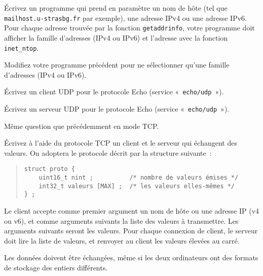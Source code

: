 %


% 

\question

Écrivez un programme qui prend en paramètre un nom de hôte (tel que
\texttt {mailhost.u-strasbg.fr} par exemple), une adresse IPv4 ou
une adresse IPv6. Pour chaque adresse trouvée par la fonction \texttt
{getaddrinfo}, votre programme doit afficher la famille d'adresses
(IPv4 ou IPv6) et l'adresse avec la fonction \texttt {inet\_ntop}.


\question

Modifiez votre programme précédent pour ne sélectionner qu'une
famille d'adresses (IPv4 ou IPv6).



\question

Écrivez un client UDP pour le protocole Echo (service «~\texttt
{echo/udp}~»).

Écrivez un serveur UDP pour le protocole Echo (service «~\texttt
{echo/udp}~»).

\question

Même question que précédemment en mode TCP.


\question

Écrivez à l'aide du protocole TCP un client et le serveur qui
échangent des valeurs. On adoptera le protocole décrit par la
structure suivante~:

\begin {quote}
\begin {verbatim}
struct proto {
    uint16_t nint ;          /* nombre de valeurs émises */
    int32_t valeurs [MAX] ;  /* les valeurs elles-mêmes */
} ;
\end{verbatim}
\end {quote}

Le client accepte comme premier argument un nom de hôte ou une
adresse IP (v4 ou v6), et comme arguments suivants la liste des
valeurs à transmettre. Les arguments suivants seront les valeurs.
Pour chaque connexion de client, le serveur doit lire la liste de
valeurs, et renvoyer au client les valeurs élevées au carré.

Les données doivent être échangées, même si les deux ordinateurs
ont des formats de stockage des entiers différents.


